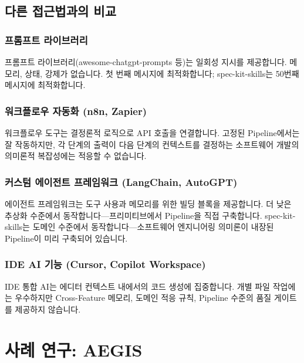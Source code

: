 \documentclass[11pt,a4paper,openright,twoside]{report}
\begin{document}
\section{다른 접근법과의 비교}

\subsection{프롬프트 라이브러리}

프롬프트 라이브러리(awesome-chatgpt-prompts 등)는 일회성 지시를 제공합니다. 메모리, 상태, 강제가 없습니다. 첫 번째 메시지에 최적화합니다; spec-kit-skills는 50번째 메시지에 최적화합니다.

\subsection{워크플로우 자동화 (n8n, Zapier)}

워크플로우 도구는 결정론적 로직으로 API 호출을 연결합니다. 고정된 Pipeline에서는 잘 작동하지만, 각 단계의 출력이 다음 단계의 컨텍스트를 결정하는 소프트웨어 개발의 의미론적 복잡성에는 적응할 수 없습니다.

\subsection{커스텀 에이전트 프레임워크 (LangChain, AutoGPT)}

에이전트 프레임워크는 도구 사용과 메모리를 위한 빌딩 블록을 제공합니다. 더 낮은 추상화 수준에서 동작합니다---프리미티브에서 Pipeline을 직접 구축합니다. spec-kit-skills는 도메인 수준에서 동작합니다---소프트웨어 엔지니어링 의미론이 내장된 Pipeline이 미리 구축되어 있습니다.

\subsection{IDE AI 기능 (Cursor, Copilot Workspace)}

IDE 통합 AI는 에디터 컨텍스트 내에서의 코드 생성에 집중합니다. 개별 파일 작업에는 우수하지만 Cross-Feature 메모리, 도메인 적응 규칙, Pipeline 수준의 품질 게이트를 제공하지 않습니다.


\chapter{사례 연구: AEGIS}
\label{ch:case-study}
\end{document}
